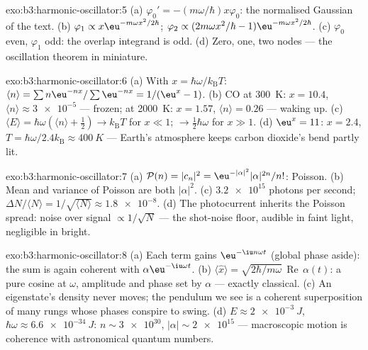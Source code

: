 \begin{solution}{exo:b3:harmonic-oscillator:5}
(a) $\varphi_0' = -(m\omega/\hbar)x\varphi_0$: the normalised
Gaussian of the text. (b) $\varphi_1 \propto x\eu^{-m\omega
x^2/2\hbar}$; $\varphi_2 \propto (2m\omega x^2/\hbar -
1)\eu^{-m\omega x^2/2\hbar}$. (c) $\varphi_0$ even, $\varphi_1$ odd:
the overlap integrand is odd. (d) Zero, one, two nodes --- the
oscillation theorem in miniature.
\end{solution}

\begin{solution}{exo:b3:harmonic-oscillator:6}
(a) With $x = \hbar\omega/k_{\text{B}}T$: $\langle n\rangle =
\sum n\eu^{-nx}/\sum\eu^{-nx} = 1/(\eu^x - 1)$. (b) CO at
\qty{300}{K}: $x = 10.4$, $\langle n\rangle \approx \num{3e-5}$ ---
frozen; at \qty{2000}{K}: $x = 1.57$, $\langle n\rangle = 0.26$ ---
waking up. (c) $\langle E\rangle = \hbar\omega(\langle n\rangle +
\tfrac12) \to k_{\text{B}}T$ for $x \ll 1$; $\to \tfrac12\hbar
\omega$ for $x \gg 1$. (d) $\eu^x = 11$: $x = 2.4$, $T =
\hbar\omega/2.4k_{\text{B}} \approx \qty{400}{K}$ --- Earth's
atmosphere keeps carbon dioxide's bend partly lit.
\end{solution}

\begin{solution}{exo:b3:harmonic-oscillator:7}
(a) $\mathcal P(n) = |c_n|^2 = \eu^{-|\alpha|^2}|\alpha|^{2n}/n!$:
Poisson. (b) Mean and variance of Poisson are both $|\alpha|^2$.
(c) $\num{3.2e15}$ photons per second; $\Delta N/\langle N\rangle =
1/\sqrt{\langle N\rangle} \approx \num{1.8e-8}$. (d) The
photocurrent inherits the Poisson spread: noise over signal
$\propto 1/\sqrt N$ --- the shot-noise floor, audible in faint
light, negligible in bright.
\end{solution}

\begin{solution}{exo:b3:harmonic-oscillator:8}
(a) Each term gains $\eu^{-\iu n\omega t}$ (global phase aside):
the sum is again coherent with $\alpha\eu^{-\iu\omega t}$. (b)
$\langle\hat x\rangle = \sqrt{2\hbar/m\omega}\,
\operatorname{Re}\,\alpha(t)$: a pure cosine at $\omega$, amplitude
and phase set by $\alpha$ --- exactly classical. (c) An eigenstate's
density never moves; the pendulum we see is a coherent
superposition of many rungs whose phases conspire to swing. (d) $E
\approx \qty{2e-3}{J}$, $\hbar\omega \approx \qty{6.6e-34}{J}$: $n
\sim \num{3e30}$, $|\alpha| \sim \num{2e15}$ --- macroscopic motion
is coherence with astronomical quantum numbers.
\end{solution}

